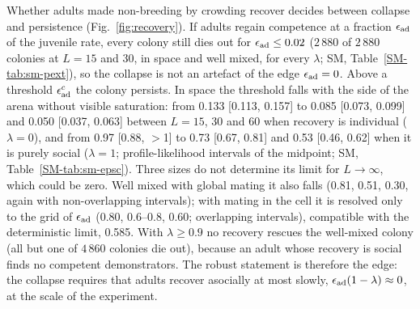 Whether adults made non-breeding by crowding recover decides between collapse and persistence
(Fig.~\ref{fig:recovery}). If adults regain competence at a fraction $\epsilon_{\rm ad}$ of the juvenile rate, every colony
still dies out for $\epsilon_{\rm ad}\le0.02$ ($2\,880$ of $2\,880$ colonies at $L=15$ and 30, in space and well mixed, for
every $\lambda$; SM, Table~\ref{SM-tab:sm-pext}), so the collapse is not an artefact of the edge $\epsilon_{\rm ad}=0$. Above a
threshold $\epsilon_{\rm ad}^c$ the colony persists. In space the threshold falls with the side of the arena without visible
saturation: from 0.133 [0.113, 0.157] to 0.085 [0.073, 0.099] and 0.050 [0.037, 0.063] between $L=15$, 30 and 60
when recovery is individual ($\lambda=0$), and from 0.97 [0.88, $>$1] to 0.73 [0.67, 0.81] and 0.53 [0.46, 0.62]
when it is purely social ($\lambda=1$; profile-likelihood intervals of the midpoint; SM, Table~\ref{SM-tab:sm-epsc}).
Three sizes do not determine its limit for $L\to\infty$, which could be zero. Well mixed with global mating it also
falls (0.81, 0.51, 0.30, again with non-overlapping intervals); with mating in the cell it is resolved only to the
grid of $\epsilon_{\rm ad}$ (0.80, 0.6--0.8, 0.60; overlapping intervals), compatible with the deterministic limit, 0.585.
With $\lambda\ge0.9$ no recovery rescues the well-mixed colony (all but one of $4\,860$ colonies die out), because
an adult whose recovery is social finds no competent demonstrators. The robust statement is therefore the edge: the collapse requires that adults recover
asocially at most slowly, $\epsilon_{\rm ad}(1-\lambda)\approx0$, at the scale of the experiment.

